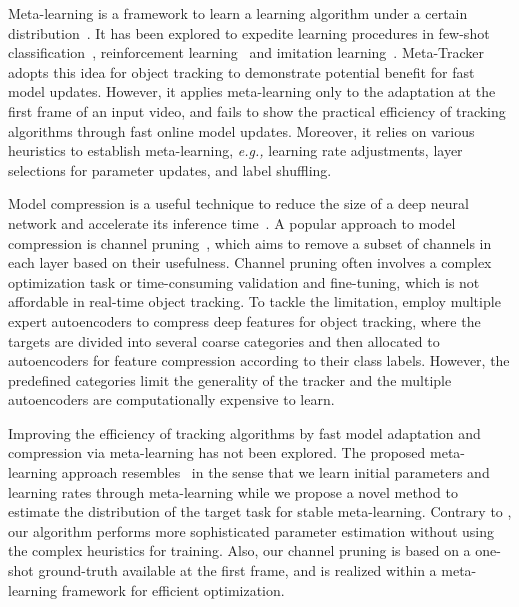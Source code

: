 \documentclass[letterpaper]{article} %
\newcommand{\hyeonwoo}[1]{{\color{red}{HW: #1}}}
\begin{document}
Meta-learning is a framework to learn a learning algorithm under a certain distribution~\cite{thrun1998learning,hochreiter2001learning}.
It has been explored to expedite learning procedures in few-shot classification~\cite{santoro2016meta,andrychowicz2016learning,finn2017model_agnostic,li2017metaSGD}, reinforcement learning~\cite{finn2017model_agnostic,al2018continuous} and imitation learning~\cite{duan2017one}.
Meta-Tracker~\cite{park2018metatracker} adopts this idea for object tracking to demonstrate potential benefit for fast model updates.
However, it applies meta-learning only to the adaptation at the first frame of an input video, and fails to show the practical efficiency of tracking algorithms through fast online model updates.
Moreover, it relies on various heuristics to establish meta-learning, {\it e.g.,} learning rate adjustments, layer selections for parameter updates, and label shuffling.

Model compression is a useful technique to reduce the size of a deep neural network and accelerate its inference time~\cite{han2015learningboth,han16deep}.
A popular approach to model compression is channel pruning~\cite{wen2016learningsparsity,he2017channel}, which aims to remove a subset of channels in each layer based on their usefulness.
Channel pruning often involves a complex optimization task or time-consuming validation and fine-tuning, which is not affordable in real-time object tracking.
To tackle the limitation, \cite{choi2018context} employ multiple expert autoencoders to compress deep features for object tracking, where the targets are divided into several coarse categories and then allocated to autoencoders for feature compression according to their class labels.
However, the predefined categories limit the generality of the tracker and the multiple autoencoders are computationally expensive to learn.


Improving the efficiency of tracking algorithms by fast model adaptation and compression via meta-learning has not been explored.
The proposed meta-learning approach resembles~\cite{finn2017model_agnostic,li2017metaSGD} in the sense that we learn initial parameters and learning rates through meta-learning while we propose a novel method to estimate the distribution of the target task for stable meta-learning.
Contrary to \cite{park2018metatracker}, our algorithm performs more sophisticated parameter estimation without using the complex heuristics for training.
Also, our channel pruning is based on a one-shot ground-truth available at the first frame, and is realized within a meta-learning framework for efficient optimization.
\end{document}
